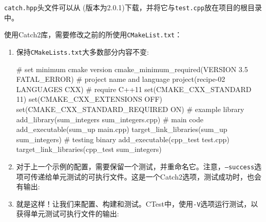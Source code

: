 \texttt{catch.hpp}头文件可以从 (版本为2.0.1)下载，并将它与\texttt{test.cpp}放在项目的根目录中。


使用Catch2库，需要修改之前的所使用\texttt{CMakeList.txt}：

\begin{enumerate}
\item 保持\texttt{CMakeLists.txt}大多数部分内容不变:

\begin{codebox}[cmake]
# set minimum cmake version
cmake_minimum_required(VERSION 3.5 FATAL_ERROR)
# project name and language
project(recipe-02 LANGUAGES CXX)
# require C++11
set(CMAKE_CXX_STANDARD 11)
set(CMAKE_CXX_EXTENSIONS OFF)
set(CMAKE_CXX_STANDARD_REQUIRED ON)
# example library
add_library(sum_integers sum_integers.cpp)
# main code
add_executable(sum_up main.cpp)
target_link_libraries(sum_up sum_integers)
# testing binary
add_executable(cpp_test test.cpp)
target_link_libraries(cpp_test sum_integers)
\end{codebox}

\item 对于上一个示例的配置，需要保留一个测试，并重命名它。注意，\texttt{--success}选项可传递给单元测试的可执行文件。这是一个Catch2选项，测试成功时，也会有输出:


\item 就是这样！让我们来配置、构建和测试。CTest中，使用\texttt{-V}选项运行测试，以获得单元测试可执行文件的输出:


\end{enumerate}
